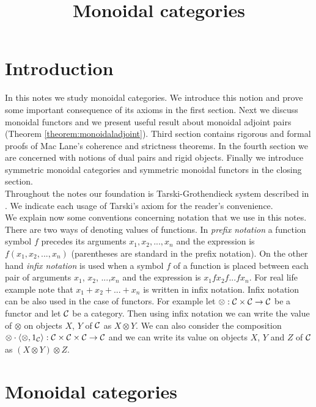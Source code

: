 



\title{Monoidal categories}
\date{}
\maketitle

\section{Introduction}
\noindent
In this notes we study monoidal categories. We introduce this notion and prove some important consequence of its axioms in the first section. Next  we discuss monoidal functors and we present useful result about monoidal adjoint pairs (Theorem \ref{theorem:monoidaladjoint}). Third section contains rigorous and formal proofs of Mac Lane's coherence and strictness theorems. In the fourth section we are concerned with notions of dual pairs and rigid objects. Finally we introduce symmetric monoidal categories and symmetric monoidal functors in the closing section.\\
Throughout the notes our foundation is Tarski-Grothendieck system described in {\cite[Introduction]{Presheaves}}. We indicate each usage of Tarski's axiom for the reader's convenience.\\
We explain now some conventions concerning notation that we use in this notes. There are two ways of denoting values of functions. In \textit{prefix notation} a function symbol $f$ precedes its arguments $x_1,x_2,...,x_n$ and the expression is $f(x_1,x_2,...,x_n)$ (parentheses are standard in the prefix notation). On the other hand \textit{infix notation} is used when a symbol $f$ of a function is placed between each pair of arguments $x_1$, $x_2$, ...,$x_n$ and the expression is $x_1 f x_2 f...fx_n$. For real life example note that $x_1+x_2+...+x_n$ is written in infix notation. Infix notation can be also used in the case of functors. For example let $\otimes:{\mathcal C}\times {\mathcal C}\rightarrow {\mathcal C}$ be a functor and let ${\mathcal C}$ be a category. Then using infix notation we can write the value of $\otimes$ on objects $X$, $Y$ of ${\mathcal C}$ as $X\otimes Y$. We can also consider the composition $\otimes\cdot \langle \otimes, 1_{{\mathcal C}}\rangle:{\mathcal C}\times {\mathcal C}\times {\mathcal C}\rightarrow {\mathcal C}$ and we can write its value on objects $X$, $Y$ and $Z$ of ${\mathcal C}$ as $(X\otimes Y)\otimes Z$.

\section{Monoidal categories}

